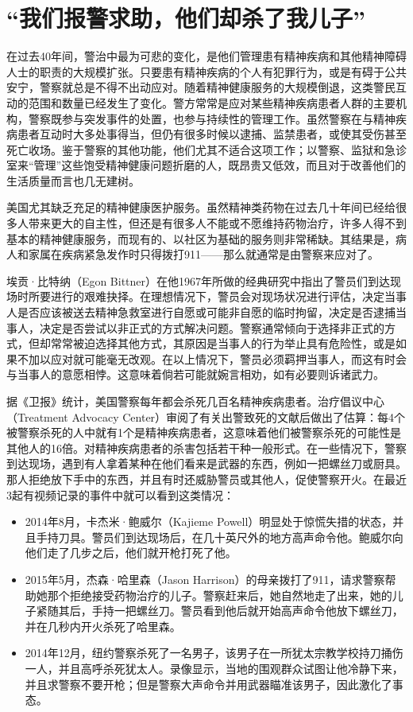 \documentclass[fontset=fandol, a4paper, 12pt, openright]{ctexbook}
\begin{document}
\chapter{“我们报警求助，他们却杀了我儿子”}

在过去40年间，警治中最为可悲的变化，是他们管理患有精神疾病和其他精神障碍人士的职责的大规模扩张。只要患有精神疾病的个人有犯罪行为，或是有碍于公共安宁，警察就总是不得不出动应对。随着精神健康服务的大规模倒退，这类警民互动的范围和数量已经发生了变化。警方常常是应对某些精神疾病患者人群的主要机构，警察既参与突发事件的处置，也参与持续性的管理工作。虽然警察在与精神疾病患者互动时大多处事得当，但仍有很多时候以逮捕、监禁患者，或使其受伤甚至死亡收场。鉴于警察的其他功能，他们尤其不适合这项工作；以警察、监狱和急诊室来“管理”这些饱受精神健康问题折磨的人，既昂贵又低效，而且对于改善他们的生活质量而言也几无建树。

美国尤其缺乏充足的精神健康医护服务。虽然精神类药物在过去几十年间已经给很多人带来更大的自主性，但还是有很多人不能或不愿维持药物治疗，许多人得不到基本的精神健康服务，而现有的、以社区为基础的服务则非常稀缺。其结果是，病人和家属在疾病紧急发作时只得拨打911——那么就通常是由警察来应对了。

埃贡·比特纳（Egon Bittner）在他1967年所做的经典研究中指出了警员们到达现场时所要进行的艰难抉择。在理想情况下，警员会对现场状况进行评估，决定当事人是否应该被送去精神急救室进行自愿或可能非自愿的临时拘留，决定是否逮捕当事人，决定是否尝试以非正式的方式解决问题。警察通常倾向于选择非正式的方式，但却常常被迫选择其他方式，其原因是当事人的行为举止具有危险性，或是如果不加以应对就可能毫无改观。在以上情况下，警员必须羁押当事人，而这有时会与当事人的意愿相悖。这意味着倘若可能就婉言相劝，如有必要则诉诸武力。

据《卫报》统计，美国警察每年都会杀死几百名精神疾病患者。治疗倡议中心（Treatment Advocacy Center）审阅了有关出警致死的文献后做出了估算：每4个被警察杀死的人中就有1个是精神疾病患者，这意味着他们被警察杀死的可能性是其他人的16倍。对精神疾病患者的杀害包括若干种一般形式。在一些情况下，警察到达现场，遇到有人拿着某种在他们看来是武器的东西，例如一把螺丝刀或厨具。那人拒绝放下手中的东西，并且有时还威胁警员或其他人，促使警察开火。在最近3起有视频记录的事件中就可以看到这类情况：

\begin{itemize}
    \item 2014年8月，卡杰米·鲍威尔（Kajieme Powell）明显处于惊慌失措的状态，并且手持刀具。警员们到达现场后，在几十英尺外的地方高声命令他。鲍威尔向他们走了几步之后，他们就开枪打死了他。
    \item 2015年5月，杰森·哈里森（Jason Harrison）的母亲拨打了911，请求警察帮助她那个拒绝接受药物治疗的儿子。警察赶来后，她自然地走了出来，她的儿子紧随其后，手持一把螺丝刀。警员看到他后就开始高声命令他放下螺丝刀，并在几秒内开火杀死了哈里森。
    \item 2014年12月，纽约警察杀死了一名男子，该男子在一所犹太宗教学校持刀捅伤一人，并且高呼杀死犹太人。录像显示，当地的围观群众试图让他冷静下来，并且求警察不要开枪；但是警察大声命令并用武器瞄准该男子，因此激化了事态。
\end{itemize}
\end{document}
